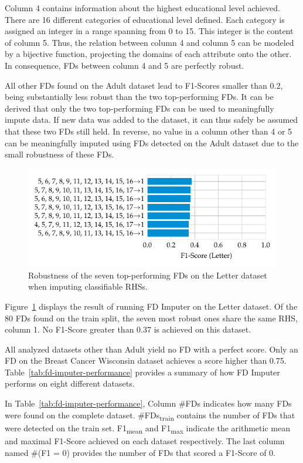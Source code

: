Column 4 contains information about the highest educational level achieved.
There are 16 different categories of educational level defined.
Each category is assigned an integer in a range spanning from 0 to 15.
This integer is the content of column 5.
Thus, the relation between column 4 and column 5 can be modeled by a bijective function, projecting the domains of each attribute onto the other.
In consequence, FDs between column 4 and 5 are perfectly robust.

All other FDs found on the Adult dataset lead to F1-Scores smaller than \( 0.2\), being substantially less robust than the two top-performing FDs.
It can be derived that only the two top-performing FDs can be used to meaningfully impute data.
If new data was added to the dataset, it can thus safely be assumed that these two FDs still held.
In reverse, no value in a column other than 4 or 5 can be meaningfully imputed using FDs detected on the Adult dataset due to the small robustness of these FDs.
\begin{figure}[ht]
     \centering
     \includegraphics[width=\textwidth]{../figures/letter/f1_fd_imputer.pdf}
     \caption{Robustness of the seven top-performing FDs on the Letter dataset when imputing classifiable RHSs.}
     \label{fig:f1_fd_letter}
\end{figure}
Figure~\ref{fig:f1_fd_letter} displays the result of running FD Imputer on the Letter dataset.
Of the 80 FDs found on the train split, the seven most robust ones share the same RHS, column 1.
No F1-Score greater than 0.37 is achieved on this dataset.

All analyzed datasets other than Adult yield no FD with a perfect score.
Only an FD on the Breast Cancer Wisconsin dataset achieves a score higher than 0.75.
Table~\ref{tab:fd-imputer-performance} provides a summary of how FD Imputer performs on eight different datasets.

In Table~\ref{tab:fd-imputer-performance}, Column \#FDs indicates how many FDs were found on the complete dataset.
\#FDs\textsubscript{train} contains the number of FDs that were detected on the train set.
F1\textsubscript{mean} and F1\textsubscript{max} indicate the arithmetic mean and maximal F1-Score achieved on each dataset respectively.
The last column named \#(F1 = 0) provides the number of FDs that scored a F1-Score of 0.

